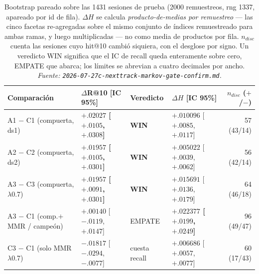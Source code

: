 \documentclass[11pt]{article}
\newcommand{\best}[1]{\textbf{#1}}
\begin{document}
\begin{table}[ht]
  \centering
  \caption{Bootstrap pareado sobre las \num{1431} sesiones de prueba (\num{2000}
  remuestreos, rng \num{1337}, apareado por id de fila). $\Delta H$ se calcula
  \emph{producto-de-medias por remuestreo} --- las cinco facetas re-agregadas sobre
  el mismo conjunto de índices remuestreado para ambas ramas, y luego multiplicadas
  --- no como media de productos por fila. $n_{disc}$ cuenta las sesiones cuyo
  hit@10 cambió siquiera, con el desglose por signo. Un veredicto WIN significa que
  el IC de recall queda enteramente sobre cero, EMPATE que abarca; los límites se
  abrevian a cuatro decimales por ancho.
  \emph{Fuente: \texttt{2026-07-27c-nexttrack-markov-gate-confirm.md}.}}
  \label{tab:markovgate-paired}
  {\scriptsize\setlength{\tabcolsep}{4pt}\begin{tabular}{llllr}
    \toprule
    Comparación & $\Delta$R@10 [IC 95\%] & Veredicto & $\Delta H$ [IC 95\%] & $n_{disc}$ ($+$/$-$) \\
    \midrule
    A1 $-$ C1 (compuerta, ds1) & \best{$+.02027$ [$+.0105$, $+.0308$]} & \best{WIN} & $+.010096$ [$+.0085$, $+.0117$] & 57 (43/14) \\
    A2 $-$ C2 (compuerta, ds2) & \best{$+.01957$ [$+.0105$, $+.0301$]} & \best{WIN} & $+.005022$ [$+.0039$, $+.0062$] & 56 (42/14) \\
    A3 $-$ C3 (compuerta, $\lambda$0.7) & \best{$+.01957$ [$+.0091$, $+.0301$]} & \best{WIN} & $+.015691$ [$+.0136$, $+.0179$] & 64 (46/18) \\
    A3 $-$ C1 (comp.$+$MMR / campeón) & $+.00140$ [$-.0119$, $+.0147$] & EMPATE & \best{$+.022377$ [$+.0199$, $+.0249$]} & 96 (49/47) \\
    C3 $-$ C1 (solo MMR $\lambda$0.7) & $-.01817$ [$-.0294$, $-.0077$] & cuesta recall & $+.006686$ [$+.0057$, $+.0077$] & 60 (17/43) \\
    \bottomrule
  \end{tabular}}
\end{table}
\end{document}
